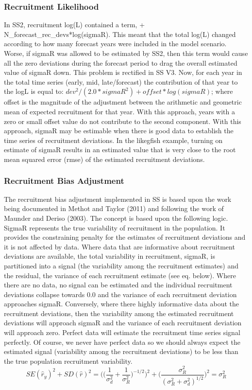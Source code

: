 \subsubsection{Recruitment Likelihood}
In SS2, recruitment log(L) contained a term, + N\_forecast\_rec\_devs*log(sigmaR).  This meant that the total log(L) changed according to how many forecast years were included in the model scenario.  Worse, if sigmaR was allowed to be estimated by SS2, then this term would cause all the zero deviations during the forecast period to drag the overall estimated value of sigmaR down.  This problem is rectified in SS V3.  Now, for each year in the total time series (early, mid, late/forecast) the contribution of that year to the logL is equal to:  $dev^2/(2.0*sigmaR^2)+offset*log(sigmaR)$; where offset is the magnitude of the adjustment between the arithmetic and geometric mean of expected recruitment for that year.  With this approach, years with a zero or small offset value do not contribute to the second component.  With this approach, sigmaR may be estimable when there is good data to establish the time series of recruitment deviations.  In the likegfish example, turning on estimate of sigmaR results in an estimated value that is very close to the root mean squared error (rmse) of the estimated recruitment deviations.

\subsubsection{Recruitment Bias Adjustment}
The recruitment bias adjustment implemented in SS is based upon the work being documented in Methot and Taylor (2011) and following the work of Maunder and Deriso (2003).  The concept is based upon the following logic.  SigmaR represents the true variability of recruitment in the population.  It provides the constraining penalty for the estimates of recruitment deviations and it is not affected by data.  Where data that are informative about recruitment deviations are available, the total variability in recruitment, sigmaR, is partitioned into a signal (the variability among the recruitment estimates) and the residual, the variance of each recruitment estimate (see eq. below).  Where there are no data, no signal can be estimated and the individual recruitment deviations collapse towards 0.0 and the variance of each recruitment deviation approaches sigmaR.  Conversely, where there highly informative data about the recruitment deviations, then the variability among the estimated recruitment deviations will approach sigmaR and the variance of each recruitment deviation will approach zero.  Perfect data will estimate the recruitment time series signal perfectly.  Of course, we never have perfect data so we should always expect the estimated signal (variability among the recruitment deviations) to be less than the true population recruitment variability.
\begin{equation}
	SE(\hat{r}_y)^2 + SD(\hat{r})^2=\Bigg( \bigg( \frac{1}{\sigma^2_d}+\frac{1}{\sigma^2_R}\bigg)^{-1/2}\Bigg)^2+\Bigg( \frac{\sigma^2_R}{(\sigma^2_R+\sigma^2_d)^{1/2}}\Bigg)^2=\sigma^2_R
\end{equation}

